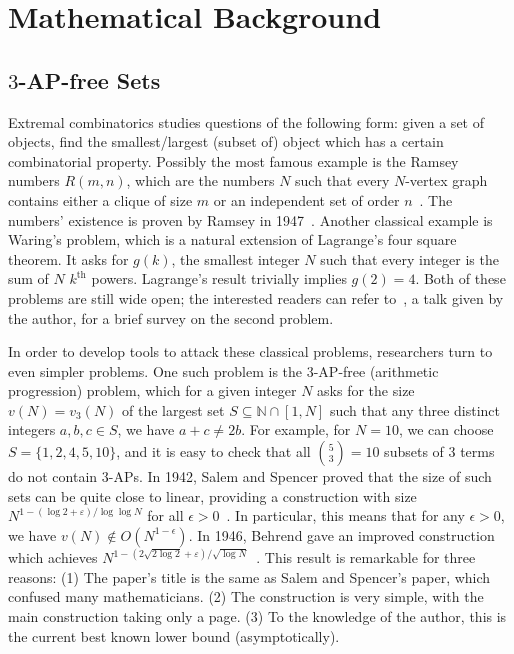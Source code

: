 \section{Mathematical Background}

\subsection{\(3\)-AP-free Sets} \label{sec:3ap_free}

Extremal combinatorics studies questions of the following form: given a set of objects, find the smallest/largest (subset of) object which has a certain combinatorial property. Possibly the most famous example is the Ramsey numbers \(R(m, n)\), which are the numbers \(N\) such that every \(N\)-vertex graph contains either a clique of size \(m\) or an independent set of order \(n\)~\cite{SamJacques2024}. The numbers' existence is proven by Ramsey in 1947~\cite{Erdös1947}. Another classical example is Waring's problem, which is a natural extension of Lagrange's four square theorem. It asks for \(g(k)\), the smallest integer \(N\) such that every integer is the sum of \(N\) \(k^\text{th}\) powers. Lagrange's result trivially implies \(g(2) = 4\). Both of these problems are still wide open; the interested readers can refer to~\cite{Ma2024}, a talk given by the author, for a brief survey on the second problem.

In order to develop tools to attack these classical problems, researchers turn to even simpler problems. One such problem is the \(3\)-AP-free (arithmetic progression) problem, which for a given integer \(N\) asks for the size \(v(N) = v_3(N)\) of the largest set \(S \subseteq \mathbb{N} \cap [1, N]\) such that any three distinct integers \(a, b, c \in S\), we have \(a + c \neq 2b\). For example, for \(N = 10\), we can choose \(S = \{1, 2, 4, 5, 10\}\), and it is easy to check that all \(\binom{5}{3} = 10\) subsets of \(3\) terms do not contain \(3\)-APs. In 1942, Salem and Spencer proved that the size of such sets can be quite close to linear, providing a construction with size \(N^{1 - (\log 2 + \varepsilon) / \log \log N}\) for all \(\epsilon > 0\)~\cite{SalemSpencer1942}. In particular, this means that for any \(\epsilon > 0\), we have \(v(N) \not \in O(N^{1 - \epsilon})\). In 1946, Behrend gave an improved construction which achieves \(N^{1 - (2\sqrt{2 \log 2} + \varepsilon) / \sqrt{\log N}}\)~\cite{Behrend1946}. This result is remarkable for three reasons: (1) The paper's title is the same as Salem and Spencer's paper, which confused many mathematicians. (2) The construction is very simple, with the main construction taking only a page. (3) To the knowledge of the author, this is the current best known lower bound (asymptotically).

